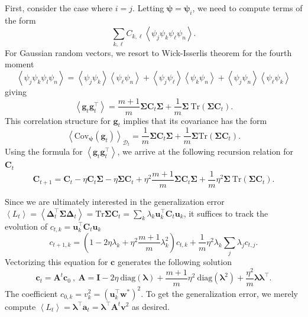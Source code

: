 \documentclass{article} %
\def\w{\bm w}
\def\w{\mathbf w}
\def\bSigma{\mathbf \Sigma}
\def\A{\mathbf A}
\def\u{\mathbf u}
\def\I{\mathbf I}
\def\C{\mathbf C}
\def\g{\mathbf g}
\begin{document}
First, consider the case where $i=j$. Letting $\bm \psi = \bm\psi_i$, we need to compute terms of the form
\begin{equation}
    \sum_{k,\ell} C_{k,\ell} \left< \psi_j \psi_k \psi_\ell \psi_n \right>.
\end{equation}
%
For Gaussian random vectors, we resort to Wick-Isserlis theorem for the fourth moment
\begin{equation}
    \left< \psi_j \psi_k \psi_l \psi_n \right> = \left< \psi_j \psi_k \right>\left< \psi_\ell \psi_n \right> +  \left< \psi_j \psi_\ell \right>\left< \psi_k \psi_n \right> +  \left< \psi_j \psi_n \right>\left< \psi_\ell \psi_k \right>
\end{equation}
giving
\begin{equation}
    \left< \g_t \g_t^\top \right> = \frac{m+1}{m} \bSigma \C_t \bSigma + \frac{1}{m} \bSigma \  \text{Tr}\left(  \bSigma \C_t \right).
\end{equation}
%
This correlation structure for $\g_t$ implies that its covariance has the form
\begin{equation}
    \left< \text{Cov}_{\bm\psi}(\g_t) \right>_{\mathcal D_t} = \frac{1}{m} \bSigma \C_t \bSigma + \frac{1}{m} \bSigma \text{Tr}(\bSigma \C_t).
\end{equation}
%
Using the formula for $\left< \g_t \g_t^\top \right>$, we arrive at the following recursion relation for $\C_t$
\begin{equation}
    \C_{t+1} = \C_t - \eta \C_t \bSigma - \eta\bSigma \C_t + \eta^2 \frac{m + 1}{m} \bSigma \C_t \bSigma + \frac{1}{m} \eta^2 \bSigma \ \text{Tr}\left( \bSigma \C_t \right).
\end{equation}

Since we are ultimately interested in the generalization error $\left< L_t \right> = \left< \bm\Delta_t^\top \bm\Sigma \bm\Delta_t \right>= \text{Tr} \bSigma \C_t = \sum_{k} \lambda_k \u_k^\top \C_t \u_k$, it suffices to track the evolution of $c_{t,k} = \u_k^\top \C_t \u_k$
\begin{equation}
    c_{t+1,k} = \left(1-2 \eta \lambda_k + \eta^2 \frac{m + 1}{m} \lambda_k^2 \right) c_{t,k} + \frac{1}{m}\eta^2 \lambda_k \sum_{j } \lambda_j c_{t,j}.
\end{equation}
%
Vectorizing this equation for $\mathbf{c}$ generates the following solution
\begin{equation}
    \mathbf{c}_t = \A^t \mathbf{c}_0 \ , \ \A = \I - 2\eta \ \text{diag}(\bm\lambda) + \frac{m+1}{m} \eta^2 \ \text{diag}(\bm\lambda^2) + \frac{\eta^2}{m} \bm\lambda \bm\lambda^\top.
\end{equation}
%
The coefficient $c_{0,k} = v_k^2 = \left( \u_k^\top \w^* \right)^2$. To get the generalization error, we merely compute $\left< L_t \right> =  \bm\lambda^\top \mathbf{a}_t = \bm\lambda^\top \A^t \mathbf{v}^2$ as desired.
\end{document}
